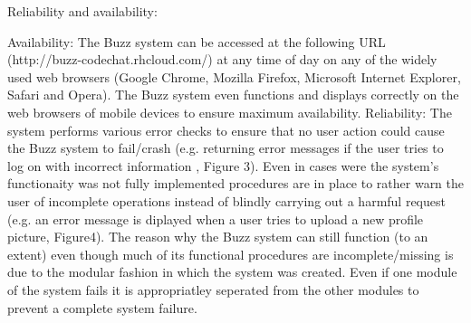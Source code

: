 \item Reliability and availability:

Availability:
The Buzz system can be accessed at the following URL (http://buzz-codechat.rhcloud.com/) at any time of day on any of the widely used web browsers (Google Chrome, Mozilla Firefox, Microsoft Internet Explorer, Safari and Opera). The Buzz system even functions and displays correctly on the web browsers of mobile devices to ensure maximum availability.
Reliability:
The system performs various error checks to ensure that no user action could cause the Buzz system to fail/crash (e.g. returning error messages if the user tries to log on with incorrect information , Figure 3). Even in cases were the system’s functionaity was not fully implemented procedures are in place to rather warn the user of incomplete operations instead of blindly carrying out a harmful request (e.g. an error message is diplayed when a user tries to upload a new profile picture, Figure4). The reason why the Buzz system can still function (to an extent) even though much of its functional procedures are incomplete/missing is due to the modular fashion in which the system was created. Even if one module of the system fails it is appropriatley seperated from the other modules to prevent a complete system failure.
	
